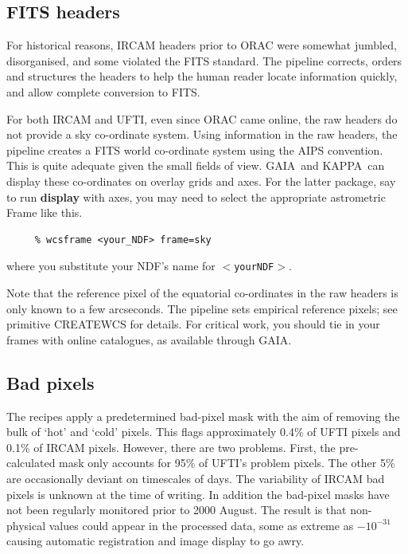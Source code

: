 \documentclass[twoside,11pt]{article}
\newcommand{\htmladdnormallink}[2]{#1}
\newcommand{\xlabel}[1]{}
\renewcommand{\_}{\texttt{\symbol{95}}}
\newcommand{\GAIA}{{\footnotesize GAIA}}
\newcommand{\KAPPA}{{\footnotesize KAPPA}}
\begin{document}
\subsection{\xlabel{fits_headers}FITS headers\label{fits_headers}}

For historical reasons, IRCAM headers prior to ORAC were somewhat
jumbled, disorganised, and some violated the 
\htmladdnormallink{FITS standard}{http://archive.stsci.edu/fits/fits_standard/}.
The pipeline corrects, orders and structures the headers to help
the human reader locate information quickly, and allow complete 
conversion to FITS.

For both IRCAM and UFTI, even since ORAC came online, the raw headers
do not provide a sky co-ordinate system.  Using information in the raw
headers, the pipeline creates a FITS world co-ordinate system using
the AIPS convention.  This is quite adequate given the small fields of
view.  \GAIA\ and \KAPPA\ can display these co-ordinates on overlay
grids and axes.  For the latter package, say to run {\bf display}
with axes, you may need to select the appropriate astrometric Frame
like this.

\begin{verbatim}
     % wcsframe <your_NDF> frame=sky
\end{verbatim}
where you substitute your NDF's name for {\tt$<$your\_NDF$>$}.

Note that the reference pixel of the equatorial co-ordinates in the
raw headers is only known to a few arcseconds.  The pipeline sets
empirical reference pixels; see primitive \_CREATE\_WCS\_ for
details.  For critical work, you should tie in your frames with online
catalogues, as available through \GAIA.

\subsection{\xlabel{bad_pixels}Bad pixels\label{bad_pixels}}

The recipes apply a predetermined bad-pixel mask with the aim of
removing the bulk of `hot' and `cold' pixels.  This flags
approximately 0.4\% of UFTI pixels and 0.1\% of IRCAM pixels.
However, there are two problems.  First, the pre-calculated mask
only accounts for 95\% of UFTI's problem pixels.  The
\htmladdnormallink{other 5\% are occasionally deviant on timescales of
days}{http://www.jach.hawaii.edu/JACpublic/UKIRT/instruments/ufti/badpixels.html}.
The variability of IRCAM bad pixels is unknown at the time of writing.
In addition the bad-pixel masks have not been regularly monitored
prior to 2000 August.  The result is that non-physical values could
appear in the processed data, some as extreme as $-10^{-31}$ causing
automatic registration and image display to go awry.
\end{document}
